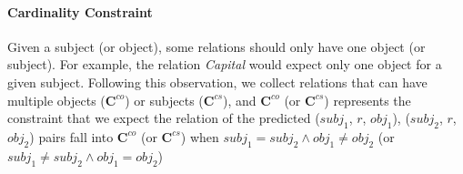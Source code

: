 \paragraph{Cardinality Constraint}
Given a subject (or object), some relations should only have one object (or subject).
For example, the relation \emph{Capital} would expect only one object for a given subject.
Following this observation, we collect relations that can have multiple objects ($\bm{C}^{co}$) or subjects ($\bm{C}^{cs}$),
and $\bm{C}^{co}$ (or $\bm{C}^{cs}$) represents the constraint that we expect the relation of the predicted ($subj_1$, $r$, $obj_1$),  ($subj_2$, $r$, $obj_2$) pairs fall into $\bm{C}^{co}$ (or $\bm{C}^{cs}$) when $subj_1=subj_2 \land obj_1\neq obj_2$ (or $subj_1\neq subj_2 \land obj_1=obj_2$)


